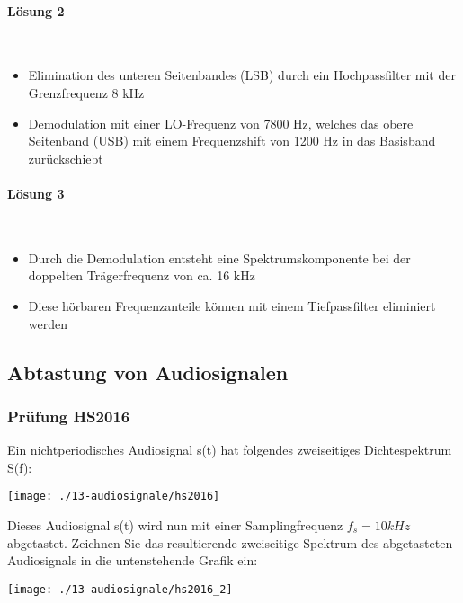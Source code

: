 \paragraph{Lösung 2}\mbox{}\\
\begin{itemize}
    \item Elimination des unteren Seitenbandes (LSB) durch ein Hochpassfilter mit der Grenzfrequenz 8 kHz
    \item Demodulation mit einer LO-Frequenz von 7800 Hz, welches das obere Seitenband (USB) mit einem Frequenzshift von 1200 Hz in das Basisband zurückschiebt
\end{itemize}

\paragraph{Lösung 3}\mbox{}\\
\begin{itemize}
    \item Durch die Demodulation entsteht eine Spektrumskomponente bei der doppelten Trägerfrequenz von ca. 16 kHz
    \item Diese hörbaren Frequenzanteile können mit einem Tiefpassfilter eliminiert werden
\end{itemize}

\subsection{Abtastung von Audiosignalen}
\subsubsection{Prüfung HS2016}
Ein nichtperiodisches Audiosignal s(t) hat folgendes zweiseitiges Dichtespektrum S(f):
\begin{center}
    \vspace{-8pt}
    \texttt{[image: ./13-audiosignale/hs2016]}
    \vspace{-8pt}
\end{center}

Dieses Audiosignal s(t) wird nun mit einer Samplingfrequenz $f_s = 10 kHz$ abgetastet. Zeichnen Sie das resultierende zweiseitige Spektrum des abgetasteten Audiosignals in die
untenstehende Grafik ein:
\begin{center}
    \vspace{-8pt}
    \texttt{[image: ./13-audiosignale/hs2016\_2]}
    \vspace{-8pt}
\end{center}


